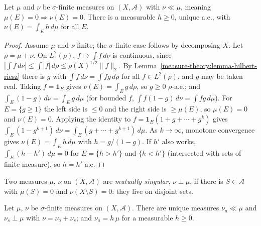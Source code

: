 \begin{theorem}\label{measure-theory:theorem-radon-nikodym}
Let $\mu$ and $\nu$ be $\sigma$-finite measures on $(X, \mathcal{A})$ with $\nu \ll \mu$, meaning $\mu(E) = 0 \Rightarrow \nu(E) = 0$. There is a measurable $h \geq 0$, unique a.e., with
$\nu(E) = \int_Eh\,d\mu$ for all $E$.
\end{theorem}

\begin{proof}
Assume $\mu$ and $\nu$ finite; the $\sigma$-finite case follows by decomposing $X$. Let $\rho = \mu + \nu$. On $L^2(\rho)$, $f \mapsto \int f\,d\nu$ is continuous, since
$|\int f\,d\nu| \leq \int|f|\,d\rho \leq \rho(X)^{1/2}\|f\|_2$. By Lemma~\ref{measure-theory:lemma-hilbert-riesz} there is $g$ with $\int f\,d\nu = \int fg\,d\rho$ for all $f \in L^2(\rho)$, and $g$ may be taken real. Taking
$f = \mathbf{1}_E$ gives $\nu(E) = \int_Eg\,d\rho$, so $g \geq 0$ $\rho$-a.e.; and $\int_E(1 - g)\,d\nu = \int_Eg\,d\mu$ (for bounded $f$, $\int f(1 - g)\,d\nu = \int fg\,d\mu$). For $E = \{g \geq 1\}$ the left side
is $\leq 0$ and the right side is $\geq \mu(E)$, so $\mu(E) = 0$ and $\nu(E) = 0$. Applying the identity to $f = \mathbf{1}_E(1 + g + \cdots + g^k)$ gives $\int_E(1 - g^{k+1})\,d\nu = \int_E(g + \cdots + g^{k+1})\,d\mu$. As
$k \to \infty$, monotone convergence gives $\nu(E) = \int_Eh\,d\mu$ with $h = g/(1 - g)$. If $h'$ also works, $\int_E(h - h')\,d\mu = 0$ for $E = \{h > h'\}$ and $\{h < h'\}$ (intersected with sets of finite measure), so
$h = h'$ a.e.
\end{proof}

Two measures $\mu$, $\nu$ on $(X, \mathcal{A})$ are \emph{mutually singular}, $\nu \perp \mu$, if there is $S \in \mathcal{A}$ with $\mu(S) = 0$ and $\nu(X \setminus S) = 0$: they live on disjoint sets.

\begin{theorem}\label{measure-theory:theorem-lebesgue-decomposition}
Let $\mu$, $\nu$ be $\sigma$-finite measures on $(X, \mathcal{A})$. There are unique measures $\nu_a \ll \mu$ and $\nu_s \perp \mu$ with $\nu = \nu_a + \nu_s$; and $\nu_a = h\,\mu$ for a measurable $h \geq 0$.
\end{theorem}

